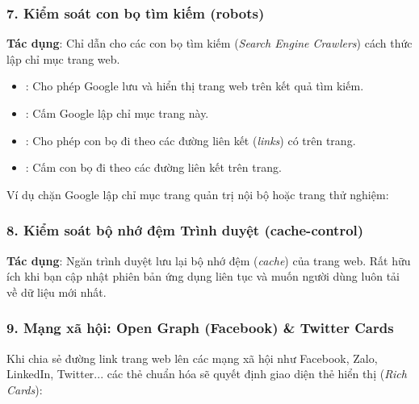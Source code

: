 \subsubsection{7. Kiểm soát con bọ tìm kiếm (robots)}
\begin{center}
\end{center}
\textbf{Tác dụng}: Chỉ dẫn cho các con bọ tìm kiếm (\textit{Search Engine Crawlers}) cách thức lập chỉ mục trang web.
\begin{itemize}[leftmargin=1.8em, itemsep=2pt, parsep=0pt]
    \item {}: Cho phép Google lưu và hiển thị trang web trên kết quả tìm kiếm.
    \item {}: Cấm Google lập chỉ mục trang này.
    \item {}: Cho phép con bọ đi theo các đường liên kết (\textit{links}) có trên trang.
    \item {}: Cấm con bọ đi theo các đường liên kết trên trang.
\end{itemize}

Ví dụ chặn Google lập chỉ mục trang quản trị nội bộ hoặc trang thử nghiệm:
\begin{center}
\end{center}

\subsubsection{8. Kiểm soát bộ nhớ đệm Trình duyệt (cache-control)}
\begin{center}
\end{center}
\textbf{Tác dụng}: Ngăn trình duyệt lưu lại bộ nhớ đệm (\textit{cache}) của trang web. Rất hữu ích khi bạn cập nhật phiên bản ứng dụng liên tục và muốn người dùng luôn tải về dữ liệu mới nhất.

\subsubsection{9. Mạng xã hội: Open Graph (Facebook) \& Twitter Cards}

Khi chia sẻ đường link trang web lên các mạng xã hội như Facebook, Zalo, LinkedIn, Twitter... các thẻ  chuẩn hóa sẽ quyết định giao diện thẻ hiển thị (\textit{Rich Cards}):

